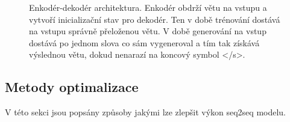 \begin{figure}[h]
    \begin{center}
    \end{center}
	\caption{Enkodér-dekodér architektura. Enkodér obdrží větu na vstupu a vytvoří inicializační stav pro dekodér. Ten v době trénování dostává na vstupu správně přeloženou větu. V době generování na vstup dostává po jednom slova co sám vygeneroval a tím tak získává výslednou větu, dokud nenarazí na koncový symbol </s>.}
	\label{img:seq2seq}
\end{figure}


\subsection{Metody optimalizace} \label{subsection:optimization} V této sekci jsou popsány způsoby jakými lze zlepšit výkon seq2seq modelu.

